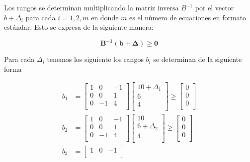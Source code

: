 \begin{solution}
  
  Los rangos se determinan multiplicando la matriz inversa $B^{-1}$ por el vector $b + \Delta_i$ para cada $i = 1, 2, m$ en donde $m$ es el número de ecuaciones en formato estándar. Esto se expresa de la siguiente manera:

  \[ \boldsymbol{B^{-1}} (\boldsymbol{b + \Delta}) \geq \boldsymbol{0}\]

  Para cada $\Delta_i$ tenemos los siguiente los rangos $b_i$ se determinan de la siguiente forma

  \begin{align*}
    b_1 &= %
          \begin{bmatrix}
      1& 0& -1\\
      0& 0& 1\\
      0& -1& 4\\
    \end{bmatrix}
    \begin{bmatrix}
      10 + \Delta_1\\
    6\\
    4\\
  \end{bmatrix}\geq
      \begin{bmatrix}
      0\\
    0\\
    0\\
  \end{bmatrix}
    \\
    b_2 & = %
          \begin{bmatrix}
      1& 0& -1\\
      0& 0& 1\\
      0& -1& 4\\
    \end{bmatrix}
    \begin{bmatrix}
      10 \\
    6 + \Delta_2\\
    4\\
  \end{bmatrix}\geq
      \begin{bmatrix}
      0\\
    0\\
    0\\
  \end{bmatrix}
    \\
        b_3 & = %
          \begin{bmatrix}
      1& 0& -1\\

\end{bmatrix}
\end{align*}
\end{solution}
